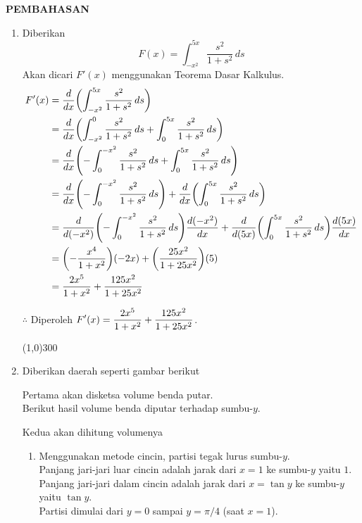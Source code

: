 \begin{center}
\textbf{\large{PEMBAHASAN}}
\end{center}
\begin{enumerate}[leftmargin=*, label={\arabic*}.]
\item Diberikan
\[
F(x) = \int_{-x^{2}}^{5x}\frac{s^{2}}{1+s^{2}}\,ds
\]
Akan dicari $F'(x)$ menggunakan Teorema Dasar Kalkulus.
\begin{align*}
    F'(x) &= \drv{x}{\int_{-x^{2}}^{5x}\frac{s^{2}}{1+s^{2}}\,ds}\\
    &= \drv{x}{\int_{-x^{2}}^{0}\frac{s^{2}}{1+s^{2}}\,ds
    +\int_{0}^{5x}\frac{s^{2}}{1+s^{2}}\,ds}\\
    &= \drv{x}{-\int_{0}^{-x^{2}}\frac{s^{2}}{1+s^{2}}\,ds
    +\int_{0}^{5x}\frac{s^{2}}{1+s^{2}}\,ds}\\
    &= \drv{x}{-\int_{0}^{-x^{2}}\frac{s^{2}}{1+s^{2}}\,ds}+
    \drv{x}{\int_{0}^{5x}\frac{s^{2}}{1+s^{2}}\,ds}\\
    &= \drv{(-x^{2})}{-\int_{0}^{-x^{2}}\frac{s^{2}}{1+s^{2}}\,ds}\frac{d(-x^{2})}{dx}+
    \drv{(5x)}{\int_{0}^{5x}\frac{s^{2}}{1+s^{2}}\,ds}\frac{d(5x)}{dx}\\
    &= \brk*{-\frac{x^{4}}{1+x^{2}}}(-2x)+\brk*{\frac{25x^{2}}{1+25x^{2}}}(5)\\
    &= \frac{2x^{5}}{1+x^{2}}+\frac{125x^{2}}{1+25x^{2}}\\
\end{align*}

$\therefore$ Diperoleh $\displaystyle F'(x) =\frac{2x^{5}}{1+x^{2}}+\frac{125x^{2}}{1+25x^{2}}$.


\begin{center}\line(1,0){300}\end{center}


\item Diberikan daerah seperti gambar berikut


    
Pertama akan disketsa volume benda putar.\\
Berikut hasil volume benda diputar terhadap sumbu-$y$.



Kedua akan dihitung volumenya
    \begin{enumerate}[label={\alph*}.]
    \item Menggunakan metode cincin, partisi tegak lurus sumbu-$y$.\\
    Panjang jari-jari luar cincin adalah jarak dari $x=1$ ke sumbu-$y$ yaitu $1$.\\
    Panjang jari-jari dalam cincin adalah jarak dari $x=\tan y$ ke sumbu-$y$ yaitu $\tan y$.\\
    Partisi dimulai dari $y=0$ sampai $y=\pi/4$ (saat $x=1$).


\end{enumerate}
\end{enumerate}

